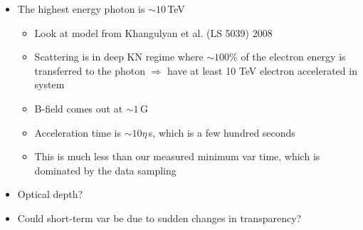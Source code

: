 \documentclass[preprint2]{aastex}
\begin{document}
\begin{itemize}
  \item The highest energy photon is $\sim10$\,TeV
    \begin{itemize}
      \item Look at model from Khangulyan et al. (LS 5039) 2008
      \item Scattering is in deep KN regime where $\sim100\%$ of the electron energy is transferred to the photon $\Rightarrow$ have at least 10 TeV electron accelerated in system
      \item B-field comes out at $\sim1$\,G
      \item Acceleration time is $\sim10\eta$\,s, which is a few hundred seconds
      \item This is much less than our measured minimum var time, which is dominated by the data sampling
      \end{itemize}
  \item Optical depth?
  \item Could short-term var be due to sudden changes in transparency?
\end{itemize}



\end{document}
